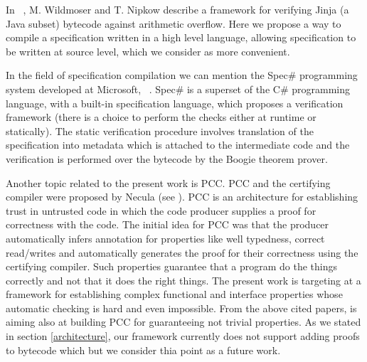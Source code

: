 In ~\cite{WildmoserN-ESOP05}, M. Wildmoser and T. Nipkow describe a framework for verifying Jinja (a Java subset) bytecode against arithmetic overflow. 
Here we propose a way to compile a specification written in a high level language, allowing specification to be written at source level, which we consider as more convenient.

In the field of specification compilation we can mention the Spec\# programming system developed at Microsoft,
~\cite{BLS04sp}. Spec\# is a superset of the C\# programming language, with a built-in  specification language,
which proposes a verification framework (there is a choice to perform the checks either at runtime or statically). 
 The static verification procedure  involves translation of the specification into metadata which is attached to the intermediate code 
 and the verification is performed over the bytecode by the Boogie theorem prover.

Another topic related to the present work is PCC.
 PCC and the certifying compiler were proposed by Necula (see \cite{Necula97,ComNec,DesNecLee98}). PCC is an architecture for establishing trust in untrusted code 
in which the code producer supplies a proof for correctness with the code. 
The initial idea for PCC  was that the producer automatically infers annotation for properties like well typedness, 
correct read/writes and automatically generates the proof for their correctness using the certifying compiler. 
Such properties guarantee that a program do the things correctly and not that it does the right things. The present work is targeting at a
 framework for establishing complex functional and interface properties whose automatic checking is hard and even impossible. 
 From the above cited papers, \cite{BM05plb} is aiming also at building PCC for
 guaranteeing not trivial properties. As we stated in section \ref{architecture}, our framework currently does not support adding proofs to bytecode 
 which but we consider thia point as a future work. 
 
